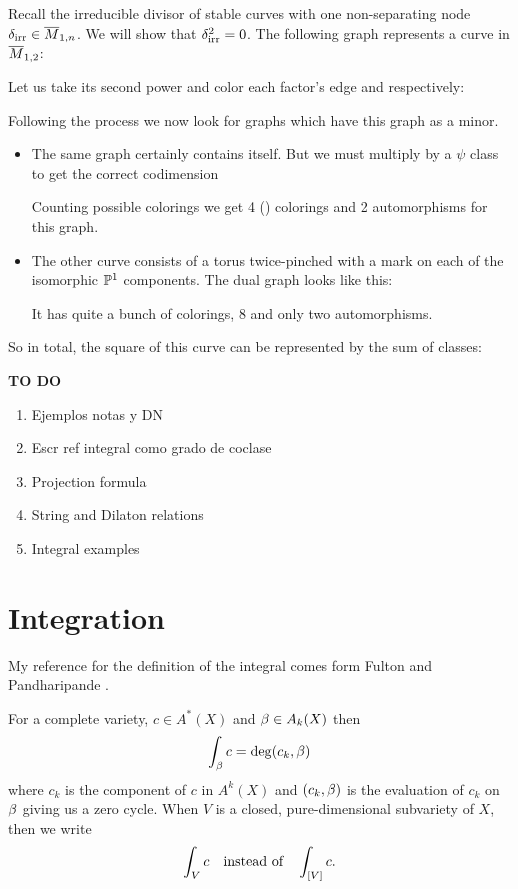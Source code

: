 \documentclass[12pt]{memoir}
\begin{document}
\begin{Ex}\label{ex-unexpectedly-zero-square}
   Recall the irreducible divisor of stable curves with one non-separating node $\delta_{\text{irr}}\in\overline{M}_{1,n}$. We will show that $\delta_{\text{irr}}^2=0$.
    The following graph represents a curve in $\overline{M}_{1,2}$:\par
    Let us take its second power and color each factor's edge  and  respectively:\par
    Following the process we now look for graphs which have this graph as a minor.
    \begin{itemize}
        \item The same graph certainly contains itself. But we must multiply by a $\psi$ class to get the correct codimension\par
        Counting possible colorings we get 4 () colorings and 2 automorphisms for this graph.
        \item The other curve consists of a torus twice-pinched with a mark on each of the isomorphic $\mathbb{P}^1$ components. The dual graph looks like this:\par
        It has quite a bunch of colorings, 8 and only two automorphisms.
    \end{itemize}
    So in total, the square of this curve can be represented by the sum of classes:
\end{Ex}

\textbf{TO DO}
\begin{enumerate}
    \item Ejemplos notas y DN
    \item Escr ref integral como grado de coclase
    \item Projection formula
    \item String and Dilaton relations
    \item Integral examples
\end{enumerate}

\section{Integration}


My reference for the definition of the integral comes form Fulton and Pandharipande \cite{FPNotes}.

\begin{Def}
    For a complete variety, $c\in A^\ast(X)$ and $\beta\in A_k(X)$ then 
    $$\int_\beta c=\deg(c_k,\beta)$$
    where $c_k$ is the component of $c$ in $A^k(X)$ and $(c_k,\beta)$ is the evaluation of $c_k$ on $\beta$ giving us a zero cycle. When $V$ is a closed, pure-dimensional subvariety of $X$, then we write 
    $$\int_V c\quad\text{instead of}\quad\int_{\left\lbrack V\right\rbrack}c.$$
\end{Def}
\end{document}
